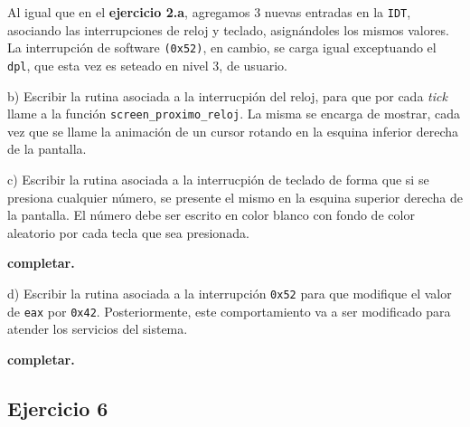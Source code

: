Al igual que en el \textbf{ejercicio 2.a}, agregamos 3 nuevas entradas en la \verb|IDT|, asociando las interrupciones 
de reloj y teclado, asign\'andoles los mismos valores. La interrupci\'on de software \verb|(0x52)|, en cambio, se carga igual exceptuando el \verb|dpl|, que esta vez es seteado en nivel 3, de usuario.

\vspace*{0.5cm} \noindent



\noindent
b) Escribir la rutina asociada a la interrucpi\'on del reloj, para que por cada \textit{tick} llame a
la funci\'on \verb|screen_proximo_reloj|. La misma se encarga de mostrar, cada vez que se llame la
animaci\'on de un cursor rotando en la esquina inferior derecha de la pantalla.

\vspace*{0.3cm}



\vspace*{0.5cm} \noindent



\noindent
c) Escribir la rutina asociada a la interrucpi\'on de teclado de forma que si se presiona cualquier
n\'umero, se presente el mismo en la esquina superior derecha de la pantalla. El n\'umero debe ser
escrito en color blanco con fondo de color aleatorio por cada tecla que sea presionada.

\vspace*{0.3cm}

\textbf{completar.}

\vspace*{0.5cm} \noindent



\noindent
d) Escribir la rutina asociada a la interrupci\'on \verb|0x52| para que modifique el valor de \verb|eax| por \verb|0x42|. Posteriormente, este comportamiento va a ser modificado para atender los servicios del sistema.

\vspace*{0.3cm}

\textbf{completar.}

\vspace*{0.5cm} \noindent





\newpage





\subsection*{Ejercicio 6}

